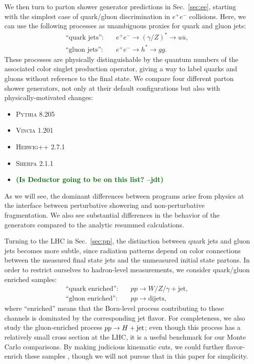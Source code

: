 \documentclass[11pt,letterpaper]{article}
\DeclareRobustCommand{\Sec}[1]{Sec.~\ref{#1}}
\newcommand{\jdt}[1]{\textbf{\textcolor{darkgreen}{(#1 --jdt)}}}
\begin{document}
We then turn to parton shower generator predictions in \Sec{sec:ee}, starting with the simplest case of quark/gluon discrimination in $e^+e^-$ collisions.  Here, we can use the following processes as unambiguous proxies for quark and gluon jets:
\begin{align}
\text{``quark jets''}: \quad & e^+e^- \to (\gamma/Z)^* \to u \overline{u}, \\
\text{``gluon jets''}: \quad & e^+e^- \to h^* \to g g.
\end{align}
These processes are physically distinguishable by the quantum numbers of the associated color singlet production operator, giving a way to label quarks and gluons without reference to the final state.  We compare four different parton shower generators, not only at their default configurations but also with physically-motivated changes:
\begin{itemize}
\item \textsc{Pythia 8.205} \cite{}
\item \textsc{Vincia 1.201} \cite{}
\item \textsc{Herwig++ 2.7.1} \cite{}
\item \textsc{Sherpa 2.1.1} \cite{}
\item \jdt{Is Deductor going to be on this list?}
\end{itemize}
As we will see, the dominant differences between programs arise from physics at the interface between perturbative showering and non-perturbative fragmentation.  We also see substantial differences in the behavior of the generators compared to the analytic resummed calculations.

Turning to the LHC in \Sec{sec:pp}, the distinction between quark jets and gluon jets becomes more subtle, since radiation patterns depend on color connections between the measured final state jets and the unmeasured initial state partons.  In order to restrict ourselves to hadron-level measurements, we consider quark/gluon enriched samples:
\begin{align}
\text{``quark enriched''}: \quad & pp \to W/Z/\gamma + \text{jet}, \\
\text{``gluon enriched''}: \quad & pp \to \text{dijets},
\end{align}
where ``enriched'' means that the Born-level process contributing to these channels is dominated by the corresponding jet flavor.  For completeness, we also study the gluon-enriched process $pp \to H + \rm{jet}$; even though this process has a relatively small cross section at the LHC, it is a useful benchmark for our Monte Carlo comparisons.  By making judicious kinematic cuts, we could further flavor-enrich these samples \cite{}, though we will not pursue that in this paper for simplicity.
\end{document}
